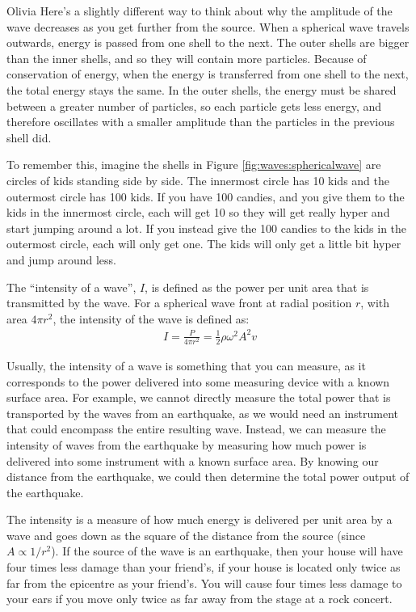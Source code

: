 \begin{studentOpinion}{Olivia}
Here's a slightly different way to think about why the amplitude of the wave decreases as you get further from the source. When a spherical wave travels outwards, energy is passed from one shell to the next. The outer shells are bigger than the inner shells, and so they will contain more particles. Because of conservation of energy, when the energy is transferred from one shell to the next, the total energy stays the same. In the outer shells, the energy must be shared between a greater number of particles, so each particle gets less energy, and therefore oscillates with a smaller amplitude than the particles in the previous shell did.

To remember this, imagine the shells in Figure \ref{fig:waves:sphericalwave} are circles of kids standing side by side. The innermost circle has 10 kids and the outermost circle has 100 kids. If you have 100 candies, and you give them to the kids in the innermost circle, each will get 10 so they will get really hyper and start jumping around a lot. If you instead give the 100 candies to the kids in the outermost circle, each will only get one. The kids will only get a little bit hyper and jump around less.
\end{studentOpinion}

The ``intensity of a wave'', $I$, is defined as the power per unit area that is transmitted by the wave. For a spherical wave front at radial position $r$, with area $4\pi r^2$, the intensity of the wave is defined as:
\begin{align*}
I = \frac{P}{4\pi r^2} = \frac{1}{2}\rho  \omega^2 A^2 v
\end{align*}

Usually, the intensity of a wave is something that you can measure, as it corresponds to the power delivered into some measuring device with a known surface area. For example, we cannot directly measure the total power that is transported by the waves from an earthquake, as we would need an instrument that could encompass the entire resulting wave. Instead, we can measure the intensity of waves from the earthquake by measuring how much power is delivered into some instrument with a known surface area. By knowing our distance from the earthquake, we could then determine the total power output of the earthquake. 

The intensity is a measure of how much energy is delivered per unit area by a wave and goes down as the square of the distance from the source (since $A\propto 1/r^2$). If the source of the wave is an earthquake, then your house will have four times less damage than your friend's, if your house is located only twice as far from the epicentre as your friend's. You will cause four times less damage to your ears if you move only twice as far away from the stage at a rock concert.

